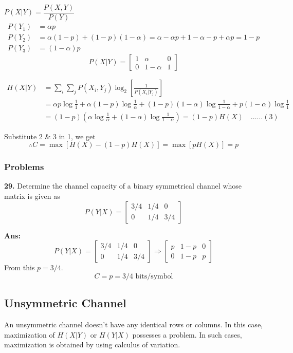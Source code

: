 \documentclass[12pt]{article}
\begin{document}
$P(X|Y) = \dfrac{P(X,Y)}{P(Y)}$
\begin{align*}
P(Y_1) &= \alpha p \\
P(Y_2) &= \alpha(1-p) + (1-p)(1-\alpha) = \alpha - \alpha p + 1 - \alpha - p + \alpha p = 1-p \\
P(Y_3) &= (1-\alpha)p
\end{align*} 
$$P(X|Y) = \begin{bmatrix}
1 & \alpha & 0 \\
0 & 1-\alpha & 1
\end{bmatrix}$$ 

\begin{align*}
H(X|Y) &= \sum_i \sum_j P(X_i, Y_j)\log_2\left[\frac{1}{P(X_i|Y_j)}\right] \\
&= \alpha p \log\frac{1}{1} + \alpha(1-p)\log\frac{1}{\alpha} + (1-p)(1-\alpha)\log\frac{1}{1-\alpha} + p(1-\alpha)\log\frac{1}{1} \\
&= (1-p) \left( \alpha \log\frac{1}{\alpha} + (1-\alpha)\log\frac{1}{1-\alpha} \right) = (1-p)H(X) \quad \dots \dots (3)
\end{align*} 

Substitute 2 \& 3 in 1, we get 
$$\therefore C = \max[H(X) - (1-p)H(X)] = \max[p H(X)] = p$$ 

\subsubsection*{Problems}
\textbf{29.} Determine the channel capacity of a binary symmetrical channel whose matrix is given as 
$$P(Y|X) = \begin{bmatrix}
3/4 & 1/4 & 0 \\ 
0 & 1/4 & 3/4
\end{bmatrix}$$ 

\textbf{Ans:}
$$P(Y|X) = \begin{bmatrix}
3/4 & 1/4 & 0 \\ 
0 & 1/4 & 3/4
\end{bmatrix} \Rightarrow \begin{bmatrix}
p & 1-p & 0 \\ 
0 & 1-p & p
\end{bmatrix}$$ 
From this $p = 3/4$. 
$$C = p = 3/4 \text{ bits/symbol}$$ 

\subsection{Unsymmetric Channel}
An unsymmetric channel doesn't have any identical rows or columns. 
In this case, maximization of $H(X|Y)$ or $H(Y|X)$ possesses a problem. In such cases, maximization is obtained by using calculus of variation. 
\end{document}
